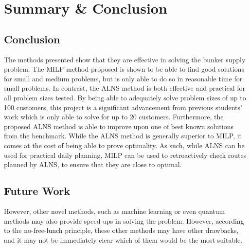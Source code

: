 \chapter{Summary \& Conclusion}
\section{Conclusion}

The methods presented show that they are effective in solving the bunker supply problem. The MILP method proposed is shown to be able to find good solutions for small and medium problems, but is only able to do so in reasonable time for small problems. In contrast, the ALNS method is both effective and practical for all problem sizes tested. By being able to adequately solve problem sizes of up to 100 customers, this project is a significant advancement from previous students' work which is only able to solve for up to 20 customers. Furthermore, the proposed ALNS method is able to improve upon one of best known solutions from the benchmark. While the ALNS method is generally superior to MILP, it comes at the cost of being able to prove optimality. As such, while ALNS can be used for practical daily planning, MILP can be used to retroactively check routes planned by ALNS, to ensure that they are close to optimal.

\section{Future Work}
However, other novel methods, such as machine learning or even quantum methods may also provide speed-ups in solving the problem. However, according to the no-free-lunch principle, these other methods may have other drawbacks, and it may not be immediately clear which of them would be the most suitable.


